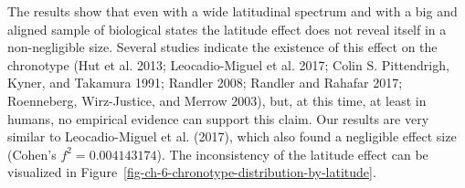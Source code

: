 \documentclass[
  12pt,
  a4paper,
  oneside]{tesesusp}
\newenvironment{Shaded}{\begin{snugshade}}{\end{snugshade}}
\newcommand{\AttributeTok}[1]{\textcolor[rgb]{0.40,0.45,0.13}{#1}}
\newcommand{\ConstantTok}[1]{\textcolor[rgb]{0.56,0.35,0.01}{#1}}
\newcommand{\DecValTok}[1]{\textcolor[rgb]{0.68,0.00,0.00}{#1}}
\newcommand{\FloatTok}[1]{\textcolor[rgb]{0.68,0.00,0.00}{#1}}
\newcommand{\FunctionTok}[1]{\textcolor[rgb]{0.28,0.35,0.67}{#1}}
\newcommand{\NormalTok}[1]{\textcolor[rgb]{0.00,0.23,0.31}{#1}}
\newcommand{\SpecialCharTok}[1]{\textcolor[rgb]{0.37,0.37,0.37}{#1}}
\newcommand{\StringTok}[1]{\textcolor[rgb]{0.13,0.47,0.30}{#1}}
\begin{document}
The results show that even with a wide latitudinal spectrum and with a
big and aligned sample of biological states the latitude effect does not
reveal itself in a non-negligible size. Several studies indicate the
existence of this effect on the chronotype (Hut et al. 2013;
Leocadio-Miguel et al. 2017; Colin S. Pittendrigh, Kyner, and Takamura
1991; Randler 2008; Randler and Rahafar 2017; Roenneberg, Wirz-Justice,
and Merrow 2003), but, at this time, at least in humans, no empirical
evidence can support this claim. Our results are very similar to
Leocadio-Miguel et al. (2017), which also found a negligible effect size
(Cohen's \(f^{2} = 0.004143174\)). The inconsistency of the latitude
effect can be visualized in
Figure~\ref{fig-ch-6-chronotype-distribution-by-latitude}.

\begin{Shaded}
\end{Shaded}
\end{document}
